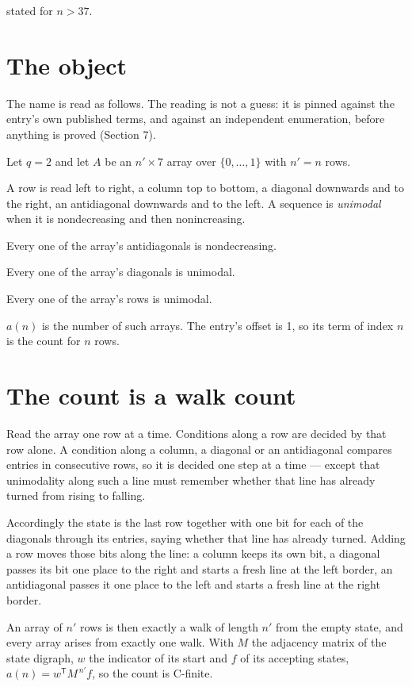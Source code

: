 \documentclass[11pt]{article}
\theoremstyle{definition}
\begin{document}
stated for $n > 37$.

\section{The object}

The name is read as follows. The reading is not a guess: it is pinned against the entry's own published terms, and against an independent enumeration, before anything is proved (Section 7).

Let $q = 2$ and let $A$ be an $n' \times 7$ array over $\{0,\dots,1\}$ with $n' = n$ rows.

A row is read left to right, a column top to bottom, a diagonal downwards and to the right, an antidiagonal downwards and to the left. A sequence is {\itshape unimodal} when it is nondecreasing and then nonincreasing.

Every one of the array's antidiagonals is nondecreasing.

Every one of the array's diagonals is unimodal.

Every one of the array's rows is unimodal.

$a(n)$ is the number of such arrays. The entry's offset is 1, so its term of index $n$ is the count for $n$ rows.

\section{The count is a walk count}

Read the array one row at a time. Conditions along a row are decided by that row alone. A condition along a column, a diagonal or an antidiagonal compares entries in consecutive rows, so it is decided one step at a time --- except that unimodality along such a line must remember whether that line has already turned from rising to falling.

Accordingly the state is the last row together with one bit for each of the diagonals through its entries, saying whether that line has already turned. Adding a row moves those bits along the line: a column keeps its own bit, a diagonal passes its bit one place to the right and starts a fresh line at the left border, an antidiagonal passes it one place to the left and starts a fresh line at the right border.

An array of $n'$ rows is then exactly a walk of length $n'$ from the empty state, and every array arises from exactly one walk. With $M$ the adjacency matrix of the state digraph, $w$ the indicator of its start and $f$ of its accepting states, $a(n) = w^{\mathsf T}M^{\,n'}f$, so the count is C-finite.
\end{document}
